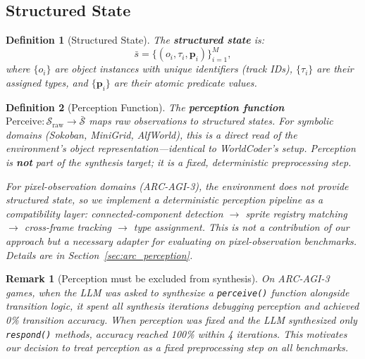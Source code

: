 \documentclass{article}
\newtheorem{definition}{Definition}
\newtheorem{remark}{Remark}
\newcommand{\calS}{\mathcal{S}}
\begin{document}
\subsection{Structured State}
\label{sec:structured_state}

\begin{definition}[Structured State]
\label{def:structured_state}
The \textbf{structured state} is:
\begin{equation}
    \bar{s} = \{(o_i, \tau_i, \mathbf{p}_i)\}_{i=1}^{M},
\end{equation}
where $\{o_i\}$ are object instances with unique identifiers (track IDs),
$\{\tau_i\}$ are their assigned types, and $\{\mathbf{p}_i\}$ are their
atomic predicate values.
\end{definition}

\begin{definition}[Perception Function]
\label{def:perception}
The \textbf{perception function} $\text{Perceive} : \calS_{\text{raw}} \to
\bar{\calS}$ maps raw observations to structured states.  For symbolic domains
(Sokoban, MiniGrid, AlfWorld), this is a direct read of the environment's
object representation---identical to WorldCoder's setup.  Perception is
\textbf{not} part of the synthesis target; it is a fixed, deterministic
preprocessing step.

For pixel-observation domains (ARC-AGI-3), the environment does not provide
structured state, so we implement a deterministic perception pipeline as a
compatibility layer: connected-component detection $\to$ sprite registry
matching $\to$ cross-frame tracking $\to$ type assignment.  This is not a
contribution of our approach but a necessary adapter for evaluating on
pixel-observation benchmarks.  Details are in Section~\ref{sec:arc_perception}.
\end{definition}

\begin{remark}[Perception must be excluded from synthesis]
\label{rem:perception}
On ARC-AGI-3 games, when the LLM was asked to synthesize a
\texttt{perceive()} function alongside transition logic, it spent all
synthesis iterations debugging perception and achieved 0\% transition
accuracy.  When perception was fixed and the LLM synthesized only
\texttt{respond()} methods, accuracy reached 100\% within 4 iterations.
This motivates our decision to treat perception as a fixed preprocessing
step on all benchmarks.
\end{remark}


\end{document}
